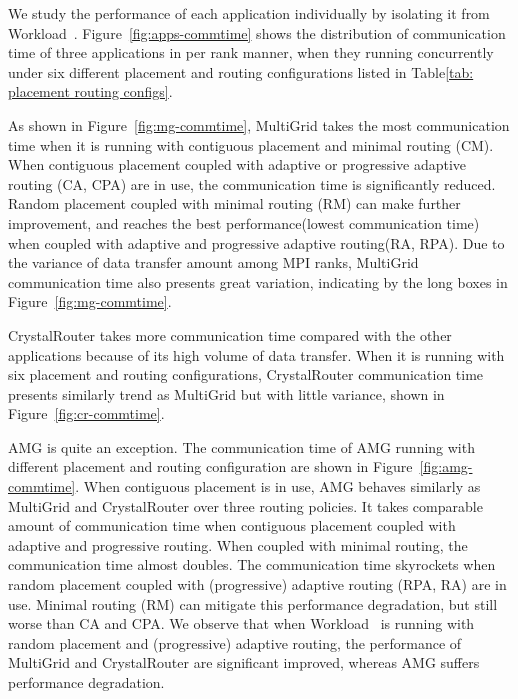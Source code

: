 We study the performance of each application individually by isolating it from Workload~.   
Figure~\ref{fig:apps-commtime} shows the distribution of communication time of three applications in per rank manner, 
when they running concurrently under six different placement and routing configurations listed in Table\ref{tab: placement routing configs}.

As shown in Figure~\ref{fig:mg-commtime}, 
MultiGrid takes the most communication time when it is running with contiguous placement and minimal routing (CM). 
When contiguous placement coupled with adaptive or progressive adaptive routing (CA, CPA) are in use, 
the communication time is significantly reduced. 
Random placement coupled with minimal routing (RM) can make further improvement, 
and reaches the best performance(lowest communication time) when coupled with adaptive and progressive adaptive routing(RA, RPA). 
Due to the variance of data transfer amount among MPI ranks, 
MultiGrid communication time also presents great variation, 
indicating by the long boxes in Figure~\ref{fig:mg-commtime}.

CrystalRouter takes more communication time compared with the other applications because of its high volume of data transfer. 
When it is running with six placement and routing configurations, 
CrystalRouter communication time presents similarly trend as MultiGrid but with little variance, shown in Figure~\ref{fig:cr-commtime}. 


AMG is quite an exception. 
The communication time of AMG running with different placement and routing configuration are shown in Figure~\ref{fig:amg-commtime}.
When contiguous placement is in use, AMG behaves similarly as MultiGrid and CrystalRouter over three routing policies. 
It takes comparable amount of communication time when contiguous placement coupled with adaptive and progressive routing. 
When coupled with minimal routing, the communication time almost doubles. 
The communication time skyrockets when random placement coupled with (progressive) adaptive routing (RPA, RA) are in use. Minimal routing (RM) can mitigate this performance degradation, but still worse than CA and CPA. We observe that when Workload~ is running with random placement and (progressive) adaptive routing, 
the performance of MultiGrid and CrystalRouter are significant improved, whereas AMG suffers performance degradation. 



